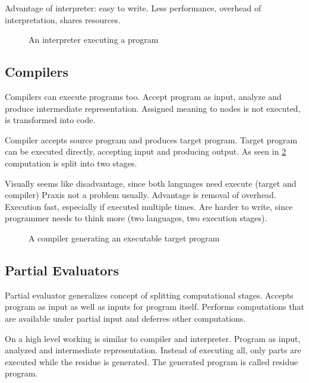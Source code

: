 Advantage of interpreter: easy to write.
Less performance, overhead of interpretation, shares resources.

\begin{figure}
  \centering
  
  \caption{An interpreter executing a program}\label{fig:interpreted-program}
\end{figure}


\subsection{Compilers}

Compilers can execute programs too.
Accept program as input, analyze and produce intermediate representation.
Assigned meaning to nodes is not executed, is transformed into code.

Compiler accepts source program and produces target program.
Target program can be executed directly, accepting input and producing output.
As seen in \ref{fig:compiled-program} computation is split into two stages.

Visually seems like disadvantage, since both languages need execute (target and compiler)
Praxis not a problem usually.
Advantage is removal of overhead.
Execution fast, especially if executed multiple times.
Are harder to write, since programmer needs to think more (two languages, two execution stages).

\begin{figure}
  \centering
  
  \caption{A compiler generating an executable target program}\label{fig:compiled-program}
\end{figure}



\subsection{Partial Evaluators}

Partial evaluator generalizes concept of splitting computational stages.
Accepts program as input as well as inputs for program itself.
Performs computations that are available under partial input and deferres other computations.

On a high level working is similar to compiler and interpreter.
Program as input, analyzed and intermediate representation.
Instead of executing all, only parts are executed while the residue is generated.
The generated program is called residue program.

